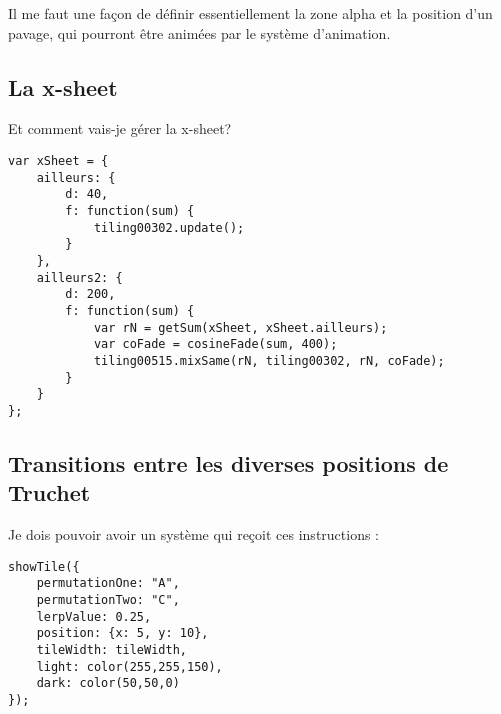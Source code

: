 Il me faut une façon de définir essentiellement la zone alpha et la position d'un pavage, qui pourront être animées par le système d'animation.

\newpage
\subsection{La x-sheet}

Et comment vais-je gérer la x-sheet?

\begin{lstlisting}
var xSheet = {
    ailleurs: {
        d: 40,
        f: function(sum) {
            tiling00302.update();
        }
    },
    ailleurs2: {
        d: 200,
        f: function(sum) {
            var rN = getSum(xSheet, xSheet.ailleurs);
            var coFade = cosineFade(sum, 400);
            tiling00515.mixSame(rN, tiling00302, rN, coFade);
        }
    }
};
\end{lstlisting}

\subsection{Transitions entre les diverses positions de Truchet}

Je dois pouvoir avoir un système qui reçoit ces instructions :

\begin{lstlisting}
showTile({
    permutationOne: "A",
    permutationTwo: "C",
    lerpValue: 0.25,
    position: {x: 5, y: 10},
    tileWidth: tileWidth,
    light: color(255,255,150),
    dark: color(50,50,0)
});
\end{lstlisting}